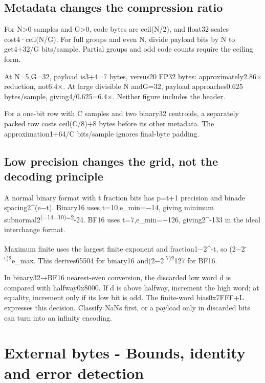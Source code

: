 \subsection{Metadata changes the compression ratio}\label{03-visual-computing-i-ch018-metadata-changes-the-compression-ratio}

For N\textgreater0 samples and G\textgreater0, code bytes are ceil(N/2), and float32 scales cost4·ceil(N/G). For full groups and even N, divide payload bits by N to get4+32/G bits/sample. Partial groups and odd code counts require the ceiling form.

At N=5,G=32, payload is3+4=7 bytes, versus20 FP32 bytes: approximately2.86× reduction, not6.4×. At large divisible N andG=32, payload approaches0.625 bytes/sample, giving4/0.625=6.4×. Neither figure includes the header.

For a one-bit row with C samples and two binary32 centroids, a separately packed row costs ceil(C/8)+8 bytes before its other metadata. The approximation1+64/C bits/sample ignores final-byte padding.

\subsection{Low precision changes the grid, not the decoding principle}\label{03-visual-computing-i-ch018-low-precision-changes-the-grid-not-the-decoding-principle}

A normal binary format with t fraction bits has p=t+1 precision and binade spacing2\^{}(e−t). Binary16 uses t=10,e\_min=−14, giving minimum subnormal2\textsuperscript{(−14−10)=2}-24. BF16 uses t=7,e\_min=−126, giving2\^{}-133 in the ideal interchange format.

Maximum finite uses the largest finite exponent and fraction1−2\^{}-t, so (2−2\textsuperscript{-t)2}e\_max. This derives65504 for binary16 and(2−2\textsuperscript{-7)2}127 for BF16.

In binary32→BF16 nearest-even conversion, the discarded low word d is compared with halfway0x8000. If d is above halfway, increment the high word; at equality, increment only if its low bit is odd. The finite-word bias0x7FFF+L expresses this decision. Classify NaNs first, or a payload only in discarded bits can turn into an infinity encoding.

\section{External bytes - Bounds, identity and error detection}\label{03-visual-computing-i-ch018-external-bytes---bounds-identity-and-error-detection}

